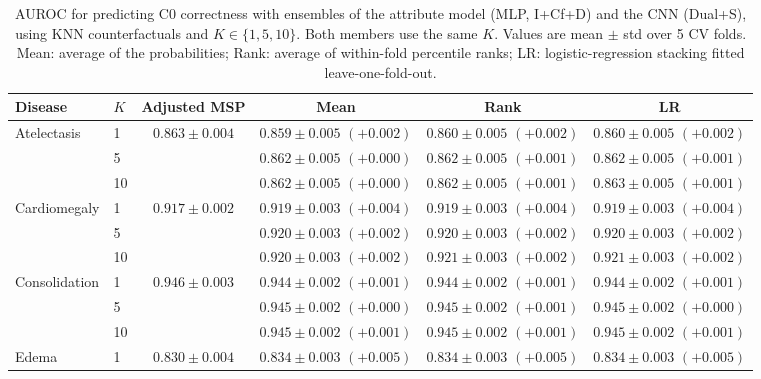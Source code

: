 \begin{table}[htbp]
\centering
\small
\caption{AUROC for predicting C0 correctness with ensembles of the attribute model (MLP, I+Cf+D) and the CNN (Dual+S), using KNN counterfactuals and $K \in \{1,5,10\}$. Both members use the same $K$. Values are mean $\pm$ std over 5 CV folds. Mean: average of the probabilities; Rank: average of within-fold percentile ranks; LR: logistic-regression stacking fitted leave-one-fold-out.}
\label{tab:ens_knn_k}
\begin{tabular}{llc|ccc}
\toprule
Disease & $K$ & Adjusted MSP & Mean & Rank & LR \\
\midrule
\multirow{3}{*}{Atelectasis} & 1 & \multirow{3}{*}{$\mathbf{0.863} \pm 0.004$} & $0.859 \pm 0.005$ {\scriptsize$(+0.002)$} & $0.860 \pm 0.005$ {\scriptsize$(+0.002)$} & $0.860 \pm 0.005$ {\scriptsize$(+0.002)$} \\
 & 5 &  & $0.862 \pm 0.005$ {\scriptsize$(+0.000)$} & $0.862 \pm 0.005$ {\scriptsize$(+0.001)$} & $0.862 \pm 0.005$ {\scriptsize$(+0.001)$} \\
 & 10 &  & $0.862 \pm 0.005$ {\scriptsize$(+0.000)$} & $0.862 \pm 0.005$ {\scriptsize$(+0.001)$} & $0.863 \pm 0.005$ {\scriptsize$(+0.001)$} \\
\midrule
\multirow{3}{*}{Cardiomegaly} & 1 & \multirow{3}{*}{$0.917 \pm 0.002$} & $0.919 \pm 0.003$ {\scriptsize$(+0.004)$} & $\mathbf{0.919} \pm 0.003$ {\scriptsize$(+0.004)$} & $0.919 \pm 0.003$ {\scriptsize$(+0.004)$} \\
 & 5 &  & $0.920 \pm 0.003$ {\scriptsize$(+0.002)$} & $0.920 \pm 0.003$ {\scriptsize$(+0.002)$} & $\mathbf{0.920} \pm 0.003$ {\scriptsize$(+0.002)$} \\
 & 10 &  & $0.920 \pm 0.003$ {\scriptsize$(+0.002)$} & $0.921 \pm 0.003$ {\scriptsize$(+0.002)$} & $\mathbf{0.921} \pm 0.003$ {\scriptsize$(+0.002)$} \\
\midrule
\multirow{3}{*}{Consolidation} & 1 & \multirow{3}{*}{$\mathbf{0.946} \pm 0.003$} & $0.944 \pm 0.002$ {\scriptsize$(+0.001)$} & $0.944 \pm 0.002$ {\scriptsize$(+0.001)$} & $0.944 \pm 0.002$ {\scriptsize$(+0.001)$} \\
 & 5 &  & $0.945 \pm 0.002$ {\scriptsize$(+0.000)$} & $0.945 \pm 0.002$ {\scriptsize$(+0.001)$} & $0.945 \pm 0.002$ {\scriptsize$(+0.000)$} \\
 & 10 &  & $0.945 \pm 0.002$ {\scriptsize$(+0.001)$} & $0.945 \pm 0.002$ {\scriptsize$(+0.001)$} & $0.945 \pm 0.002$ {\scriptsize$(+0.001)$} \\
\midrule
\multirow{3}{*}{Edema} & 1 & \multirow{3}{*}{$0.830 \pm 0.004$} & $0.834 \pm 0.003$ {\scriptsize$(+0.005)$} & $\mathbf{0.834} \pm 0.003$ {\scriptsize$(+0.005)$} & $0.834 \pm 0.003$ {\scriptsize$(+0.005)$} \\

\end{tabular}
\end{table}
